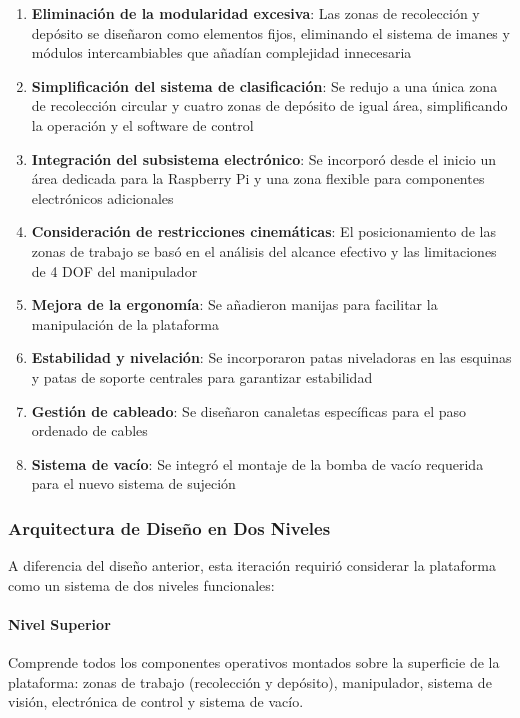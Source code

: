 \begin{enumerate}
    \item \textbf{Eliminación de la modularidad excesiva}: Las zonas de recolección y depósito se diseñaron como elementos fijos, eliminando el sistema de imanes y módulos intercambiables que añadían complejidad innecesaria
    
    \item \textbf{Simplificación del sistema de clasificación}: Se redujo a una única zona de recolección circular y cuatro zonas de depósito de igual área, simplificando la operación y el software de control
    
    \item \textbf{Integración del subsistema electrónico}: Se incorporó desde el inicio un área dedicada para la Raspberry Pi y una zona flexible para componentes electrónicos adicionales
    
    \item \textbf{Consideración de restricciones cinemáticas}: El posicionamiento de las zonas de trabajo se basó en el análisis del alcance efectivo y las limitaciones de 4 DOF del manipulador
    
    \item \textbf{Mejora de la ergonomía}: Se añadieron manijas para facilitar la manipulación de la plataforma
    
    \item \textbf{Estabilidad y nivelación}: Se incorporaron patas niveladoras en las esquinas y patas de soporte centrales para garantizar estabilidad
    
    \item \textbf{Gestión de cableado}: Se diseñaron canaletas específicas para el paso ordenado de cables
    
    \item \textbf{Sistema de vacío}: Se integró el montaje de la bomba de vacío requerida para el nuevo sistema de sujeción
\end{enumerate}

\subsubsection{Arquitectura de Diseño en Dos Niveles}

A diferencia del diseño anterior, esta iteración requirió considerar la plataforma como un sistema de dos niveles funcionales:

\paragraph{Nivel Superior}
Comprende todos los componentes operativos montados sobre la superficie de la plataforma: zonas de trabajo (recolección y depósito), manipulador, sistema de visión, electrónica de control y sistema de vacío.

